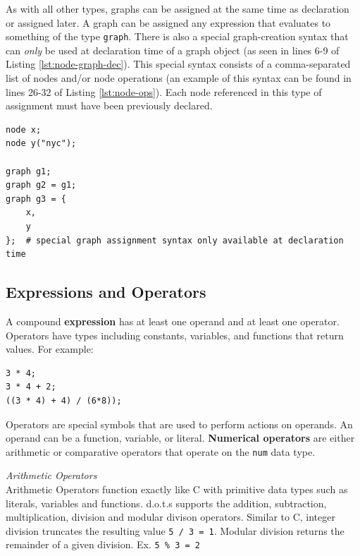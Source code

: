 \documentclass{article}
\newcommand{\code}[1]{\texttt{#1}} %
\begin{document}
As with all other types, graphs can be assigned at the same time as declaration or assigned later. A graph can be assigned any expression that evaluates to something of the type \code{graph}. There is also a special graph-creation syntax that can \emph{only} be used at declaration time of a graph object  (as seen in lines 6-9 of Listing \ref{lst:node-graph-dec}). This special syntax consists of a comma-separated list of nodes and/or node operations (an example of this syntax can be found in lines 26-32 of Listing \ref{lst:node-ops}). Each node referenced in this type of assignment must have been previously declared. \\

\begin{lstlisting}[language=pltLang, caption=Declaration of ``node'' and ``graph'' objects., label=lst:node-graph-dec]
node x;
node y("nyc");

graph g1;
graph g2 = g1;
graph g3 = { 
    x,
    y
};  # special graph assignment syntax only available at declaration time

\end{lstlisting}

\subsection{Expressions and Operators}

A compound \textbf{expression} has at least one operand and at least one operator. Operators have types including constants, variables, and functions that return values. For example:

\begin{lstlisting}[language=pltLang, caption=demonstration of expressions and subexpressions, label=lst:expr]
3 * 4; 
3 * 4 + 2;
((3 * 4) + 4) / (6*8));

\end{lstlisting} 


Operators are special symbols that are used to perform actions on operands. An operand can be a function, variable, or literal.
\textbf{Numerical operators} are either arithmetic or comparative operators that operate on the \code{num} data type.

\emph{Arithmetic Operators} \\
Arithmetic Operators function exactly like C with primitive data types such as literals,  variables and functions. d.o.t.s supports the addition, subtraction, multiplication, division and modular divison operators. Similar to C, integer division truncates the resulting value \code {5 / 3 = 1}. Modular division returns the remainder of a given division. Ex. \code {5 \% 3 = 2} 
\end{document}
